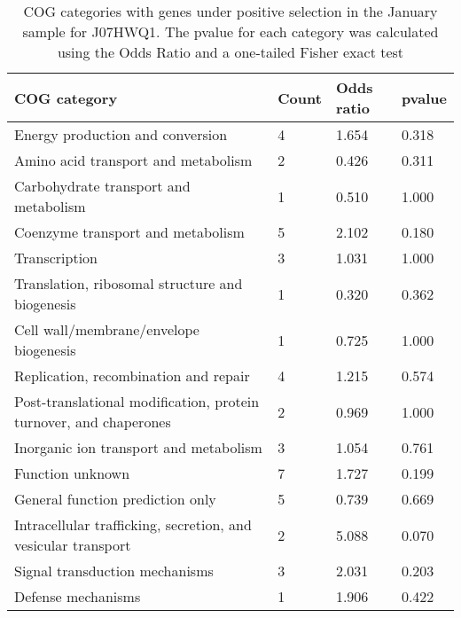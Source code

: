\begin{table}[]
\footnotesize 
	\tabcolsep=0.11cm 
\caption{COG categories with genes under positive selection in the January sample for J07HWQ1. The pvalue for each category was calculated using the Odds Ratio and a one-tailed Fisher exact test} 
\begin{tabularx}{\textwidth}{L{6cm}R{2cm}R{2cm}R{2cm}} 
\hline 
\textbf{COG category} & \textbf{Count} & \textbf{Odds ratio} & \textbf{pvalue} \\ 
\hline 
Energy production and conversion & 4 & 1.654 & 0.318 \\ 
Amino acid transport and metabolism & 2 & 0.426 & 0.311 \\ 
Carbohydrate transport and metabolism & 1 & 0.510 & 1.000 \\ 
Coenzyme transport and metabolism & 5 & 2.102 & 0.180 \\ 
Transcription & 3 & 1.031 & 1.000 \\ 
Translation, ribosomal structure and biogenesis & 1 & 0.320 & 0.362 \\ 
Cell wall/membrane/envelope biogenesis & 1 & 0.725 & 1.000 \\ 
Replication, recombination and repair & 4 & 1.215 & 0.574 \\ 
Post-translational modification, protein turnover, and chaperones & 2 & 0.969 & 1.000 \\ 
Inorganic ion transport and metabolism & 3 & 1.054 & 0.761 \\ 
Function unknown & 7 & 1.727 & 0.199 \\ 
General function prediction only & 5 & 0.739 & 0.669 \\ 
Intracellular trafficking, secretion, and vesicular transport & 2 & 5.088 & 0.070 \\ 
Signal transduction mechanisms & 3 & 2.031 & 0.203 \\ 
Defense mechanisms & 1 & 1.906 & 0.422 \\ 
\end{tabularx} 
\label{January_COG_Selection_J07HWQ1} 
 \end{table} 

